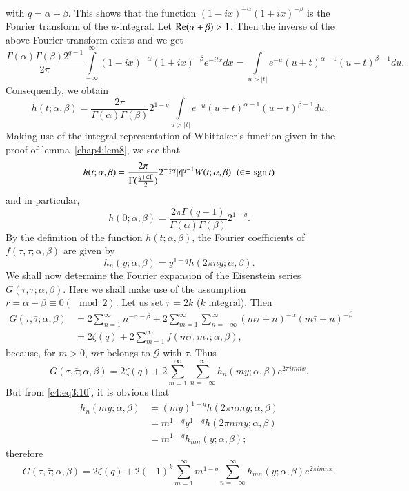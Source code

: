 with $q=\alpha + \beta$. This shows that the function
$(1-ix)^{-\alpha}(1+ix)^{-\beta}$ is the Fourier \pageoriginale
transform of the $u$-integral. Let $\operatorname{Re}(\alpha+\beta)>1$. Then the
inverse of the above Fourier transform exists and we get
$$
\frac{\Gamma(\alpha)\Gamma(\beta)2^{q-1}}{2\pi}
\int\limits^{\infty}_{-\infty} (1-ix)^{-\alpha} (1+ix)^{-\beta} 
e^{-itx} dx = \int\limits_{u>|t|} e^{-u} (u+t)^{\alpha-1}
(u-t)^{\beta-1} du.
$$
Consequently, we obtain
$$
h(t;\alpha,\beta) =\frac{2\pi}{\Gamma(\alpha)\Gamma(\beta)} 2^{1-q}
\int\limits_{u>|t|} e^{-u} (u+t)^{\alpha-1}(u-t)^{\beta-1} du.
$$
Making use of the integral representation of Whittaker's function
given in the proof of lemma~\ref{chap4:lem8}, we see that 
$$
h(t;\alpha,\beta) = \frac{2\pi}{\Gamma(\frac{q+\in
    \Gamma}{2})} 2^{-\frac{1}{2}q} |t|^{q-1} W(t;\alpha,\beta) \;\; 
(\in = \operatorname{sgn} t)
$$
and in particular,
$$
h(0;\alpha,\beta) = \frac{2\pi
  \Gamma(q-1)}{\Gamma(\alpha)\Gamma(\beta)} 2^{1-q}.
$$
By the definition of the function $h(t;\alpha,\beta)$, the Fourier
coefficients of $f(\tau,\bar{\tau};\alpha,\beta)$ are given by
\begin{equation*}
h_n(y;\alpha,\beta) = y^{1-q} h(2\pi n y; 
\alpha, \beta). \tag{10}\label{c4:eq3:10} 
\end{equation*}
We shall now determine the Fourier expansion of the Eisenstein series
$G(\tau,\bar{\tau}; \alpha,\beta)$. Here we shall make use of the
assumption $r=\alpha-\beta\equiv 0(\mod 2)$. Let us set $r=2k$ ($k$
integral). Then
\begin{align*}
G(\tau,\bar{\tau};\alpha,\beta) & = 2 \sum^{\infty}_{n=1}
n^{-\alpha-\beta} + 2 \sum^{\infty}_{m=1} \sum^{\infty}_{n=-\infty}
(m\tau+n)^{-\alpha} (m\bar{\tau}+n)^{-\beta}\\
& = 2\zeta(q) + 2 \sum^{\infty}_{m=1} f(m\tau,m\bar{\tau};\alpha,\beta),
\end{align*}
because, \pageoriginale for $m>0$, $m\tau$ belongs to $\mathscr{G}$
with $\tau$. Thus
$$
G(\tau,\bar{\tau};\alpha,\beta) = 2\zeta (q) + 2\sum^{\infty}_{m=1}
\sum^{\infty}_{n=-\infty} h_n(my;\alpha,\beta) e^{2\pi imnx}.
$$
But from \eqref{c4:eq3:10}, it is obvious that 
\begin{align*}
h_n(my;\alpha,\beta) & = (my)^{1-q} h(2\pi n my;\alpha,\beta)\\
& = m^{1-q} y^{1-q} h(2\pi n my;\alpha,\beta)\\
& = m^{1-q} h_{mn} (y;\alpha,\beta);
\end{align*}
therefore
$$
G(\tau,\bar{\tau};\alpha,\beta) = 2 \zeta(q) + 2(-1)^k
\sum^{\infty}_{m=1} m^{1-q} \sum^{\infty}_{n=-\infty} h_{mn}
(y;\alpha,\beta) e^{2\pi i mnx}.
$$
